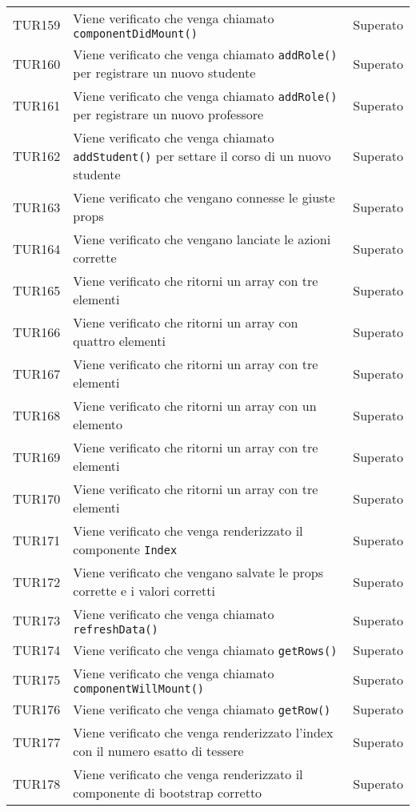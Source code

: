 \documentclass[PianoDiQualifica.tex]{subfiles}
\begin{document}
\begin{longtable}[H]{P{2cm}P{8.5cm}P{3cm}}
	TUR159 & Viene verificato che venga chiamato \texttt{componentDidMount()} & Superato \\ 
	TUR160 & Viene verificato che venga chiamato \texttt{addRole()} per registrare un nuovo studente & Superato \\ 
	TUR161 & Viene verificato che venga chiamato \texttt{addRole()} per registrare un nuovo professore & Superato \\ 
	TUR162 & Viene verificato che venga chiamato \texttt{addStudent()} per settare il corso di un nuovo studente & Superato \\ 
	TUR163 & Viene verificato che vengano connesse le giuste props & Superato \\ 
	TUR164 & Viene verificato che vengano lanciate le azioni corrette & Superato \\ 
	TUR165 & Viene verificato che ritorni un array con tre elementi & Superato \\ 
	TUR166 & Viene verificato che ritorni un array con quattro elementi & Superato \\ 
	TUR167 & Viene verificato che ritorni un array con tre elementi & Superato \\ 
	TUR168 & Viene verificato che ritorni un array con un elemento & Superato \\ 
	TUR169 & Viene verificato che ritorni un array con tre elementi & Superato \\ 
	TUR170 & Viene verificato che ritorni un array con tre elementi & Superato \\ 
	TUR171 & Viene verificato che venga renderizzato il componente \texttt{Index} & Superato \\ 
	TUR172 & Viene verificato che vengano salvate le props corrette e i valori corretti & Superato \\ 
	TUR173 & Viene verificato che venga chiamato \texttt{refreshData()} & Superato \\ 
	TUR174 & Viene verificato che venga chiamato \texttt{getRows()} & Superato \\ 
	TUR175 & Viene verificato che venga chiamato \texttt{componentWillMount()} & Superato \\ 
	TUR176 & Viene verificato che venga chiamato \texttt{getRow()} & Superato \\
	TUR177 & Viene verificato che venga renderizzato l'index con il numero esatto di tessere & Superato \\
	TUR178 & Viene verificato che venga renderizzato il componente di bootstrap corretto & Superato \\

\end{longtable}
\end{document}
